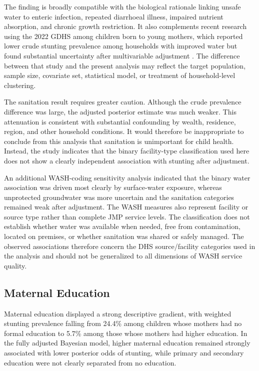 The finding is broadly compatible with the biological rationale linking unsafe water to enteric infection, repeated diarrhoeal illness, impaired nutrient absorption, and chronic growth restriction. It also complements recent research using the 2022 GDHS among children born to young mothers, which reported lower crude stunting prevalence among households with improved water but found substantial uncertainty after multivariable adjustment \citep{OgumEtAl2026}. The difference between that study and the present analysis may reflect the target population, sample size, covariate set, statistical model, or treatment of household-level clustering.

The sanitation result requires greater caution. Although the crude prevalence difference was large, the adjusted posterior estimate was much weaker. This attenuation is consistent with substantial confounding by wealth, residence, region, and other household conditions. It would therefore be inappropriate to conclude from this analysis that sanitation is unimportant for child health. Instead, the study indicates that the binary facility-type classification used here does not show a clearly independent association with stunting after adjustment.

An additional WASH-coding sensitivity analysis indicated that the binary water association was driven most clearly by surface-water exposure, whereas unprotected groundwater was more uncertain and the sanitation categories remained weak after adjustment. The WASH measures also represent facility or source type rather than complete JMP service levels. The classification does not establish whether water was available when needed, free from contamination, located on premises, or whether sanitation was shared or safely managed. The observed associations therefore concern the DHS source/facility categories used in the analysis and should not be generalized to all dimensions of WASH service quality.

\subsection{Maternal Education}

Maternal education displayed a strong descriptive gradient, with weighted stunting prevalence falling from 24.4\% among children whose mothers had no formal education to 5.7\% among those whose mothers had higher education. In the fully adjusted Bayesian model, higher maternal education remained strongly associated with lower posterior odds of stunting, while primary and secondary education were not clearly separated from no education.

